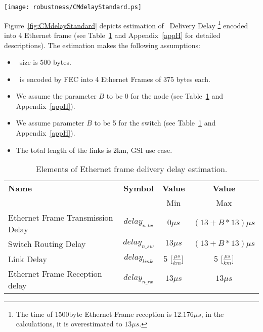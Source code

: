 \begin{center}
	\texttt{[image: robustness/CMdelayStandard.ps]}
	\label{fig:CMdelayStandard}
\end{center}

Figure~\ref{fig:CMdelayStandard} depicts estimation of \ControlMessage\ Delivery
Delay \footnote{The time of 1500byte Ethernet Frame reception is $12.176\mu s$,
in the calculations, it is overestimated to $13\mu s$.}   encoded into 4
Ethernet frame (see Table~\ref{tab:EtherFrameDelayGeneral} and 
Appendix~\ref{appH} for detailed descriptions). The estimation makes the
following assumptions:
\begin{itemize}
  \item \ControlMessage\ size is 500 bytes.
  \item \ControlMessage\ is encoded by FEC into 4 Ethernet Frames of 375 bytes
each.
  \item We assume the parameter $B$ to be 0 for the node (see
Table~\ref{tab:EtherFrameDelayGeneral} and Appendix~\ref{appH}).
  \item We assume parameter $B$ to be 5 for the switch (see
Table~\ref{tab:EtherFrameDelayGeneral} and Appendix~\ref{appH}).
  \item The total length of the links is 2km, GSI use case.
\end{itemize}

\begin{table}[ht]
\caption{Elements of Ethernet frame delivery delay estimation.} 
\centering
	\begin{tabular}{| l |  c | c | c |}          \hline
\textbf{Name}&\textbf{Symbol}&\textbf{Value}&\textbf{Value}                  \\
                                 &                &  Min& Max          \\ \hline
Ethernet Frame Transmission Delay&$delay_{n\_tx}$&$0\mu s$&$(13 + B * 13)\mu s$
\\ \hline
Switch Routing Delay &$delay_{n\_sw}$&$13\mu s$ &$(13 + B * 13)\mu s$ 
 
\\ \hline
Link Delay                       & $delay_{link}$ &5 [$\frac{\mu
s}{km}$]&5 [$\frac{\mu s}{km}$]      
\\ \hline
Ethernet Frame Reception delay   & $delay_{n\_rx}$&$13\mu s$&$13\mu s$

\\ \hline
\end{tabular}
\label{tab:EtherFrameDelayGeneral}
\end{table}


